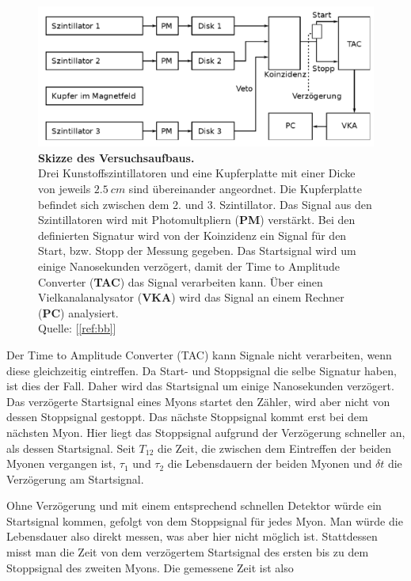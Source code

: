 \documentclass[a4paper,ngerman]{scrartcl}
\begin{document}
\begin{figure}[tb!]
  \centering
  \includegraphics[width=1\textwidth]{abbildungen/aufbau_skizze.png}
  \caption{\textbf{Skizze des Versuchsaufbaus.} 
  \\ 
  Drei Kunstoffszintillatoren und eine Kupferplatte mit einer Dicke von jeweils $\SI{2.5}{cm}$ sind übereinander angeordnet. Die Kupferplatte befindet sich zwischen dem 2. und 3. Szintillator. Das Signal aus den Szintillatoren wird mit Photomultpliern (\textbf{PM}) verstärkt. Bei den definierten Signatur wird von der Koinzidenz ein Signal für den Start, bzw. Stopp der Messung gegeben. Das Startsignal wird um einige Nanosekunden verzögert, damit der Time to Amplitude Converter (\textbf{TAC}) das Signal verarbeiten kann. Über einen Vielkanalanalysator (\textbf{VKA}) wird das Signal an einem Rechner (\textbf{PC}) analysiert.
  \\Quelle: [\ref{ref:bb}]}
  \label{fig:aufbau_skizze}
\end{figure}

Der Time to Amplitude Converter (TAC) kann Signale nicht verarbeiten, wenn diese gleichzeitig eintreffen. Da Start- und Stoppsignal die selbe Signatur haben, ist dies der Fall. 
Daher wird das Startsignal um einige Nanosekunden verzögert. 
Das verzögerte Startsignal eines Myons startet den Zähler, wird aber nicht von dessen Stoppsignal gestoppt. Das nächste Stoppsignal kommt erst bei dem nächsten Myon. Hier liegt das Stoppsignal aufgrund der Verzögerung schneller an, als dessen Startsignal. Seit $T_{12}$ die Zeit, die zwischen dem Eintreffen der beiden Myonen vergangen ist, $\tau_1$ und $\tau_2$ die Lebensdauern der beiden Myonen und $\delta t$ die Verzögerung am Startsignal. 

Ohne Verzögerung und mit einem entsprechend schnellen Detektor würde ein Startsignal kommen, gefolgt von dem Stoppsignal für jedes Myon. Man würde die Lebensdauer also direkt messen, was aber hier nicht möglich ist. Stattdessen misst man die Zeit von dem verzögertem Startsignal des ersten bis zu dem Stoppsignal des zweiten Myons. Die gemessene Zeit ist also
\end{document}
